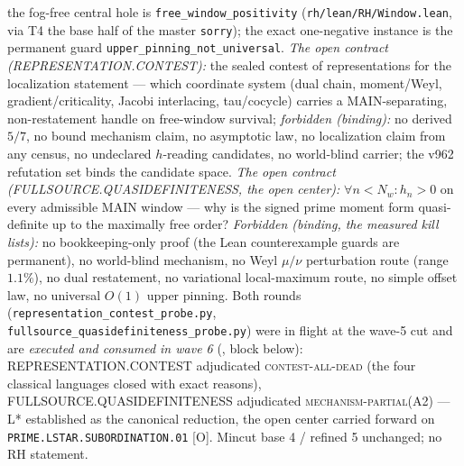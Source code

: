 \documentclass[11pt,a4paper]{article}
\begin{document}
{the fog-free central hole is \texttt{free\_window\_positivity}
(\texttt{rh/lean/RH/Window.lean}, via T4 the base half of the
master \texttt{sorry}); the exact one-negative instance is the
permanent guard \texttt{upper\_pinning\_not\_universal}.
\emph{The open contract (REPRESENTATION.CONTEST):} the sealed
contest of representations for the localization statement ---
which coordinate system (dual chain, moment/Weyl,
gradient/criticality, Jacobi interlacing, tau/cocycle) carries a
MAIN-separating, non-restatement handle on free-window survival;
\emph{forbidden (binding):} no derived $5/7$, no bound mechanism
claim, no asymptotic law, no localization claim from any census,
no undeclared $h$-reading candidates, no world-blind carrier; the
v962 refutation set binds the candidate space.  \emph{The open
contract (FULLSOURCE.QUASIDEFINITENESS, the open center):}
$\forall n < N_w : h_n > 0$ on every admissible MAIN window ---
why is the signed prime moment form quasi-definite up to the
maximally free order?  \emph{Forbidden (binding, the measured
kill lists):} no bookkeeping-only proof (the Lean counterexample
guards are permanent), no world-blind mechanism, no Weyl
$\mu/\nu$ perturbation route (range $1.1\%$), no dual
restatement, no variational local-maximum route, no simple offset
law, no universal $O(1)$ upper pinning.  Both rounds
(\texttt{representation\_contest\_probe.py},
\texttt{fullsource\_quasidefiniteness\_probe.py}) were in flight
at the wave-5 cut and are \emph{executed and consumed in wave 6}
(, block below):
REPRESENTATION.CONTEST adjudicated \textsc{contest-all-dead}
(the four classical languages closed with exact reasons),
FULLSOURCE.QUASIDEFINITENESS adjudicated
\textsc{mechanism-partial}(A2) --- L* established as the
canonical reduction, the open center carried forward on
\texttt{PRIME.LSTAR.\allowbreak SUBORDINATION.01} [O].  Mincut
base 4 / refined 5 unchanged; no RH statement.\par}
\end{document}

